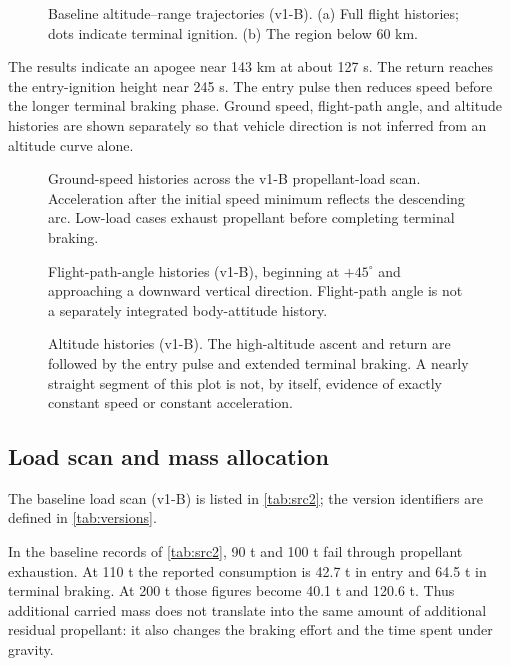 \documentclass[11pt,a4paper]{article}
\begin{document}
\begin{figure}[htbp]
\centering\SourceTrajectory
\caption{Baseline altitude--range trajectories (v1-B). (a) Full flight histories; dots indicate terminal ignition. (b) The region below 60 km.}
\label{fig:trajectory}
\end{figure}

The results indicate an apogee near 143 km at about 127 s. The return reaches the entry-ignition height near 245 s. The entry pulse then reduces speed before the longer terminal braking phase. Ground speed, flight-path angle, and altitude histories are shown separately so that vehicle direction is not inferred from an altitude curve alone.

\begin{figure}[htbp]
\centering{}
\caption{Ground-speed histories across the v1-B propellant-load scan. Acceleration after the initial speed minimum reflects the descending arc. Low-load cases exhaust propellant before completing terminal braking.}
\label{fig:speed}
\end{figure}

\begin{figure}[htbp]
\centering{}
\caption{Flight-path-angle histories (v1-B), beginning at $+45^\circ$ and approaching a downward vertical direction. Flight-path angle is not a separately integrated body-attitude history.}
\label{fig:gamma}
\end{figure}

\begin{figure}[htbp]
\centering{}
\caption{Altitude histories (v1-B). The high-altitude ascent and return are followed by the entry pulse and extended terminal braking. A nearly straight segment of this plot is not, by itself, evidence of exactly constant speed or constant acceleration.}
\label{fig:height}
\end{figure}

\subsection{Load scan and mass allocation}
The baseline load scan (v1-B) is listed in \cref{tab:src2}; the version identifiers are defined in \cref{tab:versions}.


In the baseline records of \cref{tab:src2}, 90 t and 100 t fail through propellant exhaustion. At 110 t the reported consumption is 42.7 t in entry and 64.5 t in terminal braking. At 200 t those figures become 40.1 t and 120.6 t. Thus additional carried mass does not translate into the same amount of additional residual propellant: it also changes the braking effort and the time spent under gravity.
\end{document}
